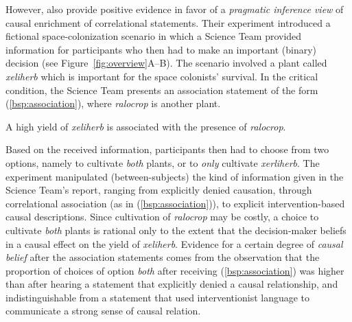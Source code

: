 \documentclass[10pt,letterpaper]{article}
\begin{document}
However, \citeauthor{lassiter2024rationality} also provide positive evidence in favor of a \textit{pragmatic inference view} of causal enrichment of correlational statements.
Their experiment introduced a fictional space-colonization scenario in which a Science Team provided information for participants who then had to make an important (binary) decision (see Figure~\ref{fig:overview}A--B).
The scenario involved a plant called \textit{xeliherb} which is important for the space colonists' survival. 
In the critical condition, the Science Team presents an association statement of the form (\ref{bsp:association}),  where \textit{ralocrop} is another plant.
%
\begin{exe}
    \ex \label{bsp:association} A high yield of \textit{xeliherb} is associated with the presence of \textit{ralocrop}.
\end{exe}
%
Based on the received information, participants then had to choose from two options, namely to cultivate \textit{both} plants, or to \textit{only} cultivate \textit{xerliherb}. 
The experiment manipulated (between-subjects) the kind of information given in the Science Team's report, ranging from explicitly denied causation, through correlational association (as in (\ref{bsp:association})), to explicit intervention-based causal descriptions. 
Since cultivation of \textit{ralocrop} may be costly, a choice to cultivate \textit{both} plants is rational only to the extent that the decision-maker beliefs in a causal effect on the yield of \textit{xeliherb}. 
Evidence for a certain degree of \textit{causal belief} after the association statements comes from the observation that the proportion of choices of option \textit{both} after receiving (\ref{bsp:association}) was higher than after hearing a statement that explicitly denied a causal relationship, and indistinguishable from a statement that used interventionist language to communicate a strong sense of causal relation. 
\end{document}
